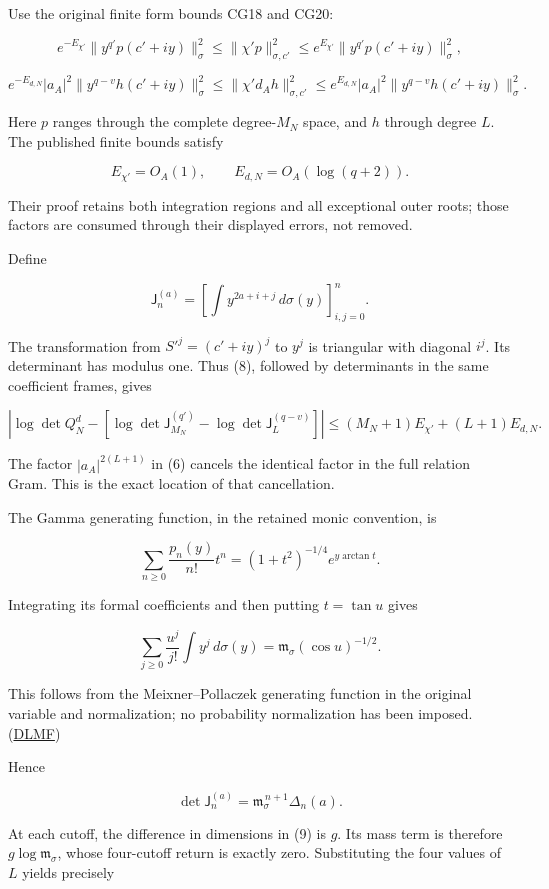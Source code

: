 \documentclass[11pt]{article}
\begin{document}
Use the original finite form bounds CG18 and CG20:

\[
e^{-E_{\chi'}}
\|y^{q'}p(c'+iy)\|_\sigma^2
\le
\|\chi'p\|_{\sigma,c'}^2
\le
e^{E_{\chi'}}
\|y^{q'}p(c'+iy)\|_\sigma^2,
\]

\[
e^{-E_{d,N}}|a_A|^2
\|y^{q-v}h(c'+iy)\|_\sigma^2
\le
\|\chi'd_Ah\|_{\sigma,c'}^2
\le
e^{E_{d,N}}|a_A|^2
\|y^{q-v}h(c'+iy)\|_\sigma^2.
\tag{8}
\]

Here \(p\) ranges through the complete degree-\(M_N\) space, and \(h\) through degree \(L\). The published finite bounds satisfy

\[
E_{\chi'}=O_A(1),
\qquad E_{d,N}=O_A(\log(q+2)).
\]

Their proof retains both integration regions and all exceptional outer roots; those factors are consumed through their displayed errors, not removed.

Define

\[
\mathsf J_n^{(a)}
=
\left[\int y^{2a+i+j}\,d\sigma(y)\right]_{i,j=0}^n.
\]

The transformation from \(S'^j=(c'+iy)^j\) to \(y^j\) is triangular with diagonal \(i^j\). Its determinant has modulus one. Thus (8), followed by determinants in the same coefficient frames, gives

\[
\boxed{
\left|
\log\det Q_N^d
-
\left[
\log\det\mathsf J_{M_N}^{(q')}
-\log\det\mathsf J_L^{(q-v)}
\right]
\right|
\le
(M_N+1)E_{\chi'}+(L+1)E_{d,N}.
}
\tag{9}
\]

The factor \(|a_A|^{2(L+1)}\) in (6) cancels the identical factor in the full relation Gram. This is the exact location of that cancellation.

The Gamma generating function, in the retained monic convention, is

\[
\sum_{n\ge0}\frac{p_n(y)}{n!}t^n
=
(1+t^2)^{-1/4}e^{y\arctan t}.
\]

Integrating its formal coefficients and then putting \(t=\tan u\) gives

\[
\boxed{
\sum_{j\ge0}\frac{u^j}{j!}
\int y^j\,d\sigma(y)
=
\mathfrak m_\sigma(\cos u)^{-1/2}.
}
\tag{10}
\]

This follows from the Meixner--Pollaczek generating function in the original variable and normalization; no probability normalization has been imposed. (\href{https://dlmf.nist.gov/18.23.E7}{DLMF})

Hence

\[
\det\mathsf J_n^{(a)}
=
\mathfrak m_\sigma^{\,n+1}\Delta_n(a).
\]

At each cutoff, the difference in dimensions in (9) is \(g\). Its mass term is therefore \(g\log\mathfrak m_\sigma\), whose four-cutoff return is exactly zero. Substituting the four values of \(L\) yields precisely
\end{document}
